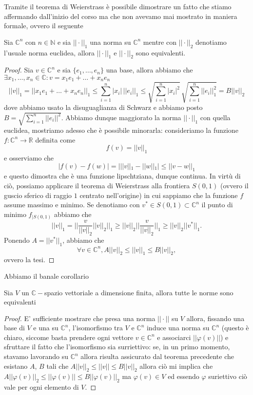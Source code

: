 \documentclass[12pt, twoside, italian, openany]{book}
\begin{document}
	Tramite il teorema di Weierstrass è possibile dimostrare un fatto che stiamo affermando dall'inizio del corso ma che non avevamo mai mostrato in maniera formale, ovvero il seguente
	\begin{theorem}
		Sia $\mathbb{C}^n$ con $n \in \mathbb{N}$ e sia $||\cdot||_1$ una norma su $\mathbb{C}^n$ mentre con $||\cdot||_2$ denotiamo l'usuale norma euclidea, allora $||\cdot||_1$ e $||\cdot||_2$ sono equivalenti.
	\end{theorem}
	\begin{proof}
		Sia $v \in \mathbb{C}^n$ e sia $\{ e_1, \ldots, e_n \}$ una base, allora abbiamo che $\exists x_1, \ldots, x_n \in \mathbb{C} : v = x_1 e_1 + \ldots + x_n e_n$
		$$
			||v||_1 = ||x_1 e_1 + \ldots + x_n e_n||_1 \leq \sum_{i=1}^{n} |x_i| \, ||e_i||_1 \leq \sqrt{\sum_{i=1}^n |x_i|^2} \, \sqrt{\sum_{i=1}^n ||e_i||_1^2} = B ||v||_2 
		$$
		dove abbiamo usato la disuguaglianza di Schwarz e abbiamo posto $B = \sqrt{\sum\limits_{i=1}^n ||e_i||^2}$. Abbiamo dunque maggiorato la norma $||\cdot||_1$ con quella euclidea, mostriamo adesso che è possibile minorarla: consideriamo la funzione $f: \mathbb{C}^n \to \mathbb{R}$ definita come
		$$
		f(v) = ||v||_1
 		$$
		e osserviamo che
		$$
			|f(v) - f(w)| = | || v ||_1 - || w ||_1 | \leq || v - w ||_1
		$$
		e questo dimostra che è una funzione lipschtziana, dunque continua. In virtù di ciò, possiamo applicare il teorema di Weierstrass alla frontiera $S(0, 1)$ (ovvero il guscio sferico di raggio $1$ centrato nell'origine) in cui sappiamo che la funzione $f$ assume massimo e minimo. Se denotiamo con 
		$v^* \in S(0, 1) \subset \mathbb{C}^n$ il punto di minimo $f_{|S(0,1)}$ abbiamo che
		$$
			|| v ||_1 = \bigg| \bigg| \frac{v}{||v||_2} ||v||_2 \bigg| \bigg|_1 \geq  ||v||_2 \bigg| \bigg| \frac{v}{||v||_2} \bigg| \bigg|_1 \geq  ||v||_2 ||v^*||_1.
		$$
		Ponendo $A = ||v^*||_1$, abbiamo che
		$$
		\forall v \in \mathbb{C}^n, A ||v||_2 \leq ||v||_1 \leq B||v||_2,
		$$
		ovvero la tesi.
	\end{proof}
	Abbiamo il banale corollario
	\begin{cor}
		Sia $V$ un $\mathbb{C}-$spazio vettoriale a dimensione finita, allora tutte le norme sono equivalenti
	\end{cor}
	\begin{proof}
		E' sufficiente mostrare che presa una norma $||\cdot||$ su $V$ allora, fissando una base di $V$ e una su $\mathbb{C}^n$, l'isomorfismo tra $V$ e $\mathbb{C}^n$ induce una norma su $\mathbb{C}^n$ (questo è chiaro, siccome basta prendere ogni vettore $v \in \mathbb{C}^n$ e associarci
		$||\varphi(v)||$) e sfruttare il fatto che l'isomorfismo sia surriettivo: se, in un primo momento, stavamo lavorando su $\mathbb{C}^n$ allora risulta assicurato dal teorema precedente che esistano $A$, $B$ tali che $A||v||_2 \leq ||v|| \leq B||v||_2$ allora ciò mi implica che $A ||\varphi(v)||_2 \leq ||\varphi(v)|| \leq B||\varphi(v)||_2$ ma
		$\varphi(v) \in V$ ed essendo $\varphi$ suriettivo ciò vale per ogni elemento di $V$.
	\end{proof}
\end{document}
